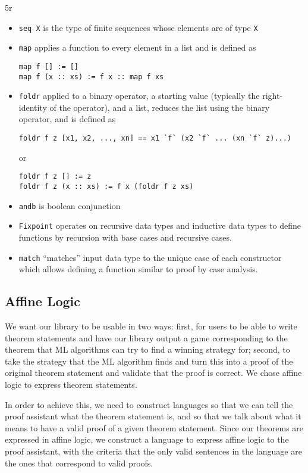 5r\documentclass{article}
\theoremstyle{definition}
\begin{document}
\begin{itemize}
    \item \verb|seq X| is the type of finite sequences whose elements are of type \verb|X|
    \item \verb|map| applies a function to every element in a list and is defined as 
\begin{verbatim}
map f [] := []
map f (x :: xs) := f x :: map f xs
\end{verbatim}
 
    \item \verb|foldr| applied to a binary operator, a starting value (typically the right-identity of the operator), and a list, reduces the list using the binary operator, and is defined as 
\begin{verbatim}
foldr f z [x1, x2, ..., xn] == x1 `f` (x2 `f` ... (xn `f` z)...)
\end{verbatim} 
or
\begin{verbatim}
foldr f z [] := z
foldr f z (x :: xs) := f x (foldr f z xs)
\end{verbatim}
    \item \verb|andb| is boolean conjunction
    \item \verb|Fixpoint| operates  on recursive data types and inductive data types to define functions by recursion with base cases and recursive cases.
    \item \verb|match| ``matches'' input data type to the unique case of each constructor which allows defining a function similar to proof by case analysis. 

\end{itemize}

\subsection{Affine Logic}

We want our library to be usable in two ways: first, for users to be able to write theorem statements and have our library output a game corresponding to the theorem that ML algorithms can try to find a winning strategy for; second, to take the strategy that the ML algorithm finds and turn this into a proof of the original theorem statement and validate that the proof is correct. 
We chose affine logic to express theorem statements. 

In order to achieve this, we need to construct languages so that we can tell the proof assistant what the theorem statement is, and so that we talk about what it means to have a valid proof of a given theorem statement. Since our theorems are expressed in affine logic, we construct a language to express affine logic to the proof assistant, with the criteria that the only valid sentences in the language are the ones that correspond to valid proofs. 
\end{document}
